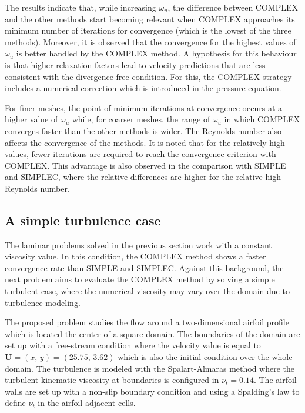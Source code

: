 \documentclass[final,3p,times,11pt,onecolumn]{myElsarticle}
\numberwithin{equation}{section}
\begin{document}
The results indicate that, while increasing $\omega_u$, the difference between COMPLEX and the other methods start becoming relevant when COMPLEX approaches  its minimum number of iterations for convergence (which is the lowest of the three methods). Moreover, it is observed that the convergence for the highest values of $\omega_u$ is better handled by the COMPLEX method. A hypothesis for this behaviour is that higher relaxation factors lead to velocity predictions that are less consistent with the divergence-free condition. For this, the COMPLEX strategy includes a numerical correction which is introduced in the pressure equation.


For finer meshes, the point of minimum iterations at convergence occurs at a higher value of $\omega_u$ while, for coarser meshes, the range of $\omega_u$ in which COMPLEX converges faster than the other methods is wider. The Reynolds number also affects the convergence of the methods. It is noted that for the relatively high values, fewer iterations are required to reach the convergence criterion with COMPLEX. This advantage is also observed in the comparison with SIMPLE and SIMPLEC, where the relative differences are higher for the relative high Reynolds number.

\subsection{A simple turbulence case}
The laminar problems solved in the previous section work with a constant viscosity value. In this condition, the COMPLEX method shows a faster convergence rate than SIMPLE and SIMPLEC. Against this background, the next problem aims to evaluate the COMPLEX method by solving a simple turbulent case, where the numerical viscosity may vary over the domain due to turbulence modeling.

The proposed problem studies the flow around a two-dimensional airfoil profile which is located the center of a square domain. 
The boundaries of the domain are set up with a free-stream  condition where the velocity value is equal to $\boldsymbol{U} = (x,\, y) = (25.75,\, 3.62)$ which is also the initial condition over the whole domain.
The turbulence is modeled with the Spalart-Almaras method where the turbulent kinematic viscosity at boundaries is configured in $\nu_t = 0.14$. The airfoil walls are set up with a non-slip boundary condition and using a Spalding's law to define $\nu_t$ in the airfoil adjacent cells. 
\end{document}
